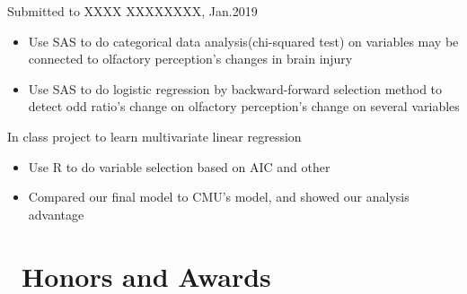 \documentclass{resume}
\begin{document}
Submitted to XXXX XXXXXXXX, Jan.2019
\begin{itemize}
  \item Use SAS to do categorical data analysis(chi-squared test) on variables may be connected to olfactory perception's changes in brain injury 
  \item Use SAS to do logistic regression by backward-forward selection method to detect odd ratio's change on olfactory perception's change on several variables 
\end{itemize}

In class project to learn multivariate linear regression
\begin{itemize}
  \item Use R to do variable selection based on AIC and other  
  \item Compared our final model to CMU's model, and showed our analysis advantage
\end{itemize}


\section{\faHeartO\ Honors and Awards}


%
%
\end{document}

